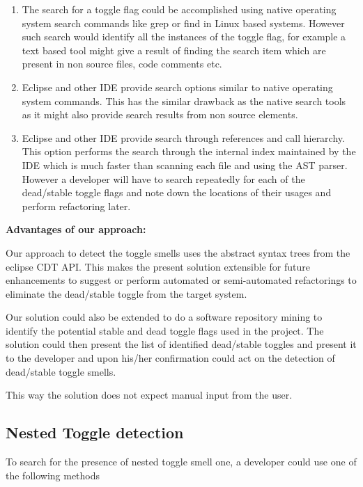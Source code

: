 \documentclass[conference]{IEEEtran}
\begin{document}
\begin{enumerate}
\item{The search for a toggle flag could be accomplished using native operating system search commands like grep or find in Linux based systems. However such search would identify all the instances of the toggle flag, for example a text based tool might give a result of finding the search item which are present in non source files, code comments etc.}

\item{Eclipse and other IDE provide search options similar to native operating system commands. This has the similar drawback as the native search tools as it might also provide search results from non source elements.}

\item{Eclipse and other IDE provide search through references and call hierarchy. This option performs the search through the internal index maintained by the IDE which is much faster than scanning each file and using the AST parser. However a developer will  have to search repeatedly for each of the dead/stable toggle flags and note down the locations of their usages and perform refactoring later.}
\end{enumerate}

\textbf{Advantages of our approach:}

Our approach to detect the toggle smells uses the abstract syntax trees from the eclipse CDT API. This makes the present solution extensible for future enhancements to suggest or perform automated or semi-automated refactorings to eliminate the dead/stable toggle from the target system.

Our solution could also be extended to do a software repository mining to identify the potential stable and dead toggle flags used in the project. The solution could then present the list of identified dead/stable toggles and present it to the developer and upon his/her confirmation could act on the detection of dead/stable toggle smells.

This way the solution does not expect manual input from the user.

\subsection{Nested Toggle detection}
To search for the presence of nested toggle smell one, a developer could use one of the following methods
\end{document}

